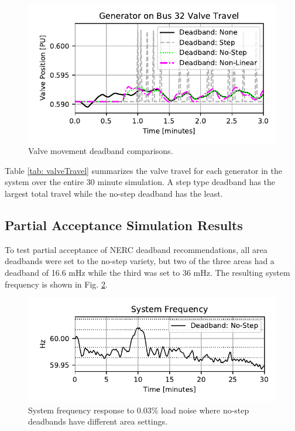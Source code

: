 \begin{figure}[!ht]
\centering
\includegraphics[width=\linewidth]{figures/gen32ValveComp}
\caption{Valve movement deadband comparisons.}
\label{fig: valveComp}
\end{figure}

Table \ref{tab: valveTravel} summarizes the valve travel for each generator in the system over the entire 30 minute simulation. 
A step type deadband has the largest total travel while the no-step deadband has the least.




\subsection{Partial Acceptance Simulation Results}
To test partial acceptance of NERC deadband recommendations, all area deadbands were set to the no-step variety, but two of the three areas had a deadband of 16.6 mHz while the third was set to 36 mHz.
The resulting system frequency is shown in Fig. \ref{fig: uniFreq}.

\begin{figure}[!ht]
\centering
\includegraphics[width=\linewidth]{figures/miniWECCuniAccFreq}
\caption{System frequency response to 0.03\% load noise where no-step deadbands have different area settings.}
\label{fig: uniFreq}
\end{figure}

